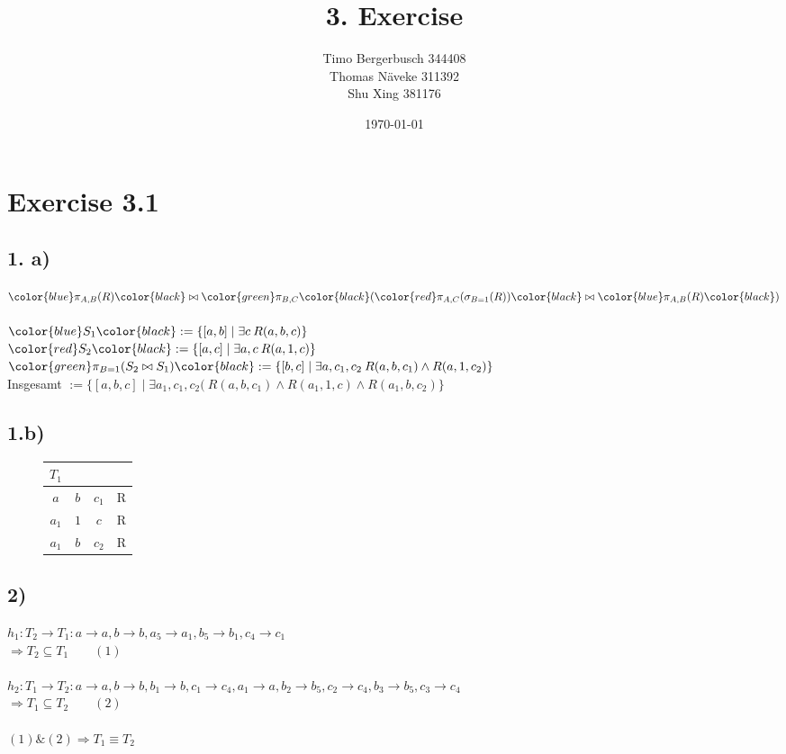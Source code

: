 \documentclass[12pt]{article}
\newcommand{\blue}[1]{\color{blue}#1\color{black}}
\newcommand{\red}[1]{\color{red}#1\color{black}}
\newcommand{\green}[1]{\color{green}#1\color{black}}
\begin{document}
	
	\title{3. Exercise}
	\author{Timo Bergerbusch 344408 \\ Thomas Näveke 311392 \\ Shu Xing 381176}
	\date{\specialdate\today}
	\maketitle
	
	\section*{Exercise 3.1}
	\subsection*{1. a)}
	
		$\blue{\pi_{A,B}(R)} \bowtie \green{\pi_{B,C}}(\red{\pi_{A,C}(\sigma_{B=1}(R))} \bowtie \blue{\pi_{A,B}(R)})$ \\\\
		$\blue{S_1} := \{ [a,b] \mid \exists c \> R(a,b, c)\}$\\
		$\red{S_2} := \{ [a,c] \mid \exists a,c \> R(a,1,c)\}$\\
		$\green{\pi_{B=1}(S_2 \bowtie S_1)} := \{ [b,c] \mid \exists a,c_1,c_2 \> R(a,b,c_1)\land R(a,1,c_2) \}$ \\
		Insgesamt $:= \{ [a,b,c] \mid \exists a_1,c_1,c_2( \> R(a,b,c_1) \land R(a_1,1,c) \land R(a_1,b,c_2)\}$
	\subsection*{1.b)}
		\begin{figure}[H]
			\hspace{1in}
			\begin{tabular}{c|c|c|c}
				$T_1$ & & & \\ \hline
				$a$ & $b$ & $c_1$ & R \\
				$a_1$ & $1$ & $c$ & R \\
				$a_1$ & $b$ & $c_2$ & R \\
			\end{tabular}
		\end{figure}
	\subsection*{2)}
		
		$h_1: T_2 \rightarrow T_1: a\rightarrow a, b \rightarrow b, a_5 \rightarrow a_1, b_5 \rightarrow b_1, c_4 \rightarrow c_1$\\
		$\Rightarrow T_2 \subseteq T_1\qquad(1)$\\
		\\
		$h_2: T_1 \rightarrow T_2: a\rightarrow a, b \rightarrow b, b_1 \rightarrow b, c_1 \rightarrow c_4, a_1 \rightarrow a, b_2 \rightarrow b_5, c_2 \rightarrow c_4, b_3 \rightarrow b_5, c_3 \rightarrow  c_4$\\
		$\Rightarrow T_1 \subseteq T_2\qquad(2)$\\
		\\		
		$(1) \text{\&}(2) \Rightarrow T_1 \equiv T_2$
	
\end{document}
